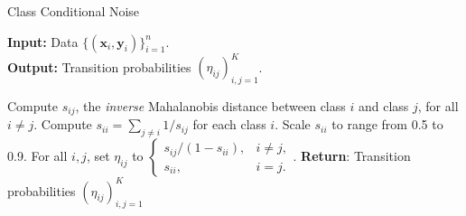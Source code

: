 \documentclass[letterpaper]{article} %
\newcommand{\bx}{{\bm{x}}}
\newcommand{\by}{{\bm{y}}}
\begin{document}



\begin{algorithm}[h]
\caption{Class Conditional Noise}
\label{alg:ccn}
\textbf{Input:} Data $\{(\bx_i,\by_i)\}_{i=1}^n$.\\ 
\textbf{Output:} Transition probabilities $(\eta_{ij})_{i,j=1}^K$.

\begin{algorithmic}[1]
\STATE Compute $s_{ij}$, the \emph{inverse} Mahalanobis distance between class $i$ and class $j$, for all $i \neq j$.
\STATE Compute $s_{ii} = \sum_{j \neq i} 1/s_{ij}$ for each class $i$.
\STATE Scale $s_{ii}$ to range from 0.5 to 0.9.
\STATE For all $i, j$, set $\eta_{ij}$ to $\begin{cases}
    s_{ij}/(1 - s_{ii}),  & i \neq j,\\
    s_{ii}, & i = j.
    \end{cases}$.
\STATE \textbf{Return}: Transition probabilities $(\eta_{ij})_{i,j=1}^K$
\end{algorithmic}
\end{algorithm}
\end{document}
